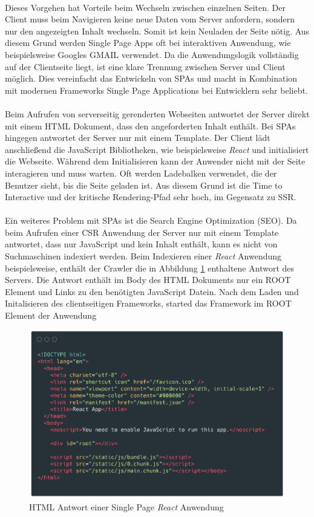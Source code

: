 \documentclass[runningheads]{llncs}
\numberwithin{figure}{section}
\begin{document}
\\
Dieses Vorgehen hat Vorteile beim Wechseln zwischen einzelnen Seiten. 
Der Client muss beim Navigieren keine neue Daten vom Server anfordern, 
sondern nur den angezeigten Inhalt wechseln. 
Somit ist kein Neuladen der Seite nötig. 
Aus diesem Grund werden Single Page Apps oft bei interaktiven Anwendung, 
wie beispielsweise Googles GMAIL verwendet. 
Da die Anwendungslogik vollständig auf der Clientseite liegt, 
ist eine klare Trennung zwischen Server und Client möglich. 
Dies vereinfacht das Entwickeln von SPAs und
macht in Kombination mit modernen Frameworks 
Single Page Applications bei Entwicklern sehr beliebt.
\\
\\
Beim Aufrufen von serverseitig gerenderten Webseiten antwortet
der Server direkt mit einem HTML Dokument, 
dass den angeforderten Inhalt enthält. 
Bei SPAs hingegen antwortet der Server nur mit einem Template. 
Der Client lädt anschließend die JavaScript Bibliotheken, 
wie beispielsweise \textit{React} und initialisiert die Webseite. 
Während dem Initialisieren kann der Anwender nicht mit der Seite interagieren
und muss warten. Oft werden Ladebalken verwendet, 
die der Benutzer sieht, bis die Seite geladen ist. 
Aus diesem Grund ist die Time to Interactive und 
der kritische Rendering-Pfad sehr hoch, im Gegensatz zu SSR. 
\\
\\
Ein weiteres Problem mit SPAs ist die Search Engine Optimization (SEO). 
Da beim Aufrufen einer CSR Anwendung der Server nur mit einem Template 
antwortet, dass nur JavaScript und kein Inhalt enthält, 
kann es nicht von Suchmaschinen indexiert werden. 
Beim Indexieren einer \textit{React} Anwendung beispielsweise, 
enthält der Crawler die in Abbildung \ref{HTML Antwort einer Single Page React Anwendung} enthaltene Antwort des Servers. 
Die Antwort enthält im Body des HTML Dokuments nur ein ROOT Element und Links zu
den benötigten JavaScript Datein. Nach dem Laden und Initalisieren des clientseitigen Frameworks,
started das Framework im ROOT Element der Anwendung
\begin{figure}[h]
  \centering
  \includegraphics[width=12cm]{images/react-code-small}
  \caption{HTML Antwort einer Single Page \textit{React} Anwendung}
  \label{HTML Antwort einer Single Page React Anwendung}
\end{figure}
\end{document}
